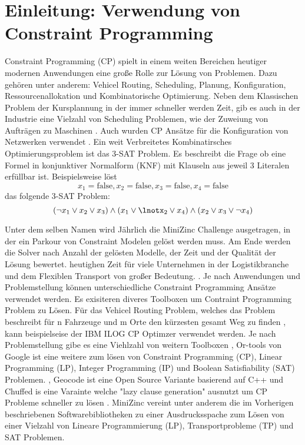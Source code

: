 




\tableofcontents

\clearpage
{}


\section{Einleitung: Verwendung von Constraint Programming}
\label{sec:Einleitung: Verwendung von Constraint Programming}
Constraint Programming (CP) spielt in einem weiten Bereichen heutiger modernen
Anwendungen eine große Rolle zur Lösung von Problemen. Dazu gehören unter
anderem: Vehicel Routing, Scheduling, Planung, Konfiguration,
Ressourcenallokation und Kombinatorische Optimierung. Neben dem Klassischen
Problem der Kursplannung \cite{duboi96jo} in der immer schneller werden Zeit,
gib es auch in der Industrie eine Vielzahl von Scheduling Problemen, wie der
Zuweiung von Aufträgen zu Maschinen \cite{gedik16jo}. Auch wurden CP Ansätze für
die Konfiguration von Netzwerken verwendet \cite{ardisjo}. Ein weit Verbreitetes
Kombinatirsches Optimierungsproblem ist das 3-SAT Problem. Es beschreibt die
Frage ob eine Formel in konjunktiver Normalform (KNF) mit Klauseln aus jeweil 3
Literalen erfüllbar ist.
Beispielsweise löst
$$x_1=\mathrm{false},x_2=\mathrm{false},x_3=\mathrm{false},x_4=\mathrm{false}$$
das folgende 3-SAT Problem: 
$$(\lnot x_1\lor x_2\lor x_3)\land(x_1\lor\lnotx_2\lor x_4)\land(x_2\lor x_3\lor\lnot x_4)$$

Unter dem selben Namen wird Jährlich die MiniZinc Challenge ausgetragen, in der
ein Parkour von Constraint Modelen gelöst werden muss. Am Ende werden die Solver
nach Anzahl der gelösten Modelle, der Zeit und der Qualität der Lösung bewertet.
heutighen Zeit für viele Unternehmen in der Logistikbranche und dem Flexiblen
Transport von großer Bedeutung. \cite[1]{delec22jo}. Je nach Anwendungen und
Problemstellung können unterschiedliche Constraint Programming Ansätze verwendet
werden. Es exisiteren diveres Toolboxen um Contraint Programming Problem zu
Lösen. Für das Vehicel Routing Problem, welches das Problem beschreibt für n
Fahrzeuge und m Orte den kürzesten gesamt Weg zu finden \cite[222]{labor18joa},
kann beispielseise der IBM ILOG CP Optimzer verwendet werden.\cite{IBMIwe} Je
nach Problemstellung gibe es eine Viehlzahl von weitern Toolboxen
\cite{Solviwea}, Or-tools von Google ist eine weitere zum lösen von Constraint
Programming (CP), Linear Programming (LP), Integer Programming (IP) und Boolean
Satisfiability (SAT) Problemen. \cite{ORToowe}, Geocode ist eine Open Source
Variante basierend auf C++ \cite{GECODwe} und Chuffed is eine Varainte welche
"lazy clause generation" ausnutzt um CP Probleme schneller zu lösen
\cite{Chuff24co}. MiniZinc vereint unter anderem die im Vorherigen beschriebenen
Softwarebibliotheken zu einer Ausdrucksspache zum Lösen von einer Vielzahl von
Lineare Programmierung (LP), Transportprobleme (TP) und SAT Problemen.
\cite{MiniZwe}


